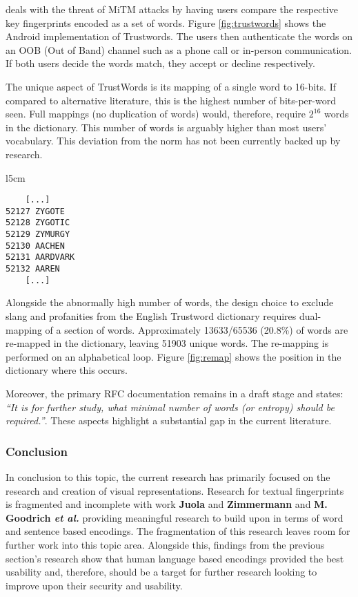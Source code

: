 \pep deals with the threat of MiTM attacks by having users compare the respective key fingerprints encoded as a set of words. Figure \ref{fig:trustwords} shows the \pep Android implementation of Trustwords. The users then authenticate the words on an OOB (Out of Band) channel such as a phone call or in-person communication. If both users decide the words match, they accept or decline respectively.

The unique aspect of TrustWords is its mapping of a single word to 16-bits. If compared to alternative literature, this is the highest number of bits-per-word seen. Full mappings (no duplication of words) would, therefore, require $2^{16}$ words in the dictionary. This number of words is arguably higher than most users' vocabulary. This deviation from the norm has not been currently backed up by research. 

\begin{wrapfigure}[11]{l}{5cm}
    \centering
    \begin{BVerbatim}
    [...]
52127 ZYGOTE
52128 ZYGOTIC
52129 ZYMURGY
52130 AACHEN
52131 AARDVARK
52132 AAREN
    [...]
    \end{BVerbatim}
    \caption{Re-mapping position}
    \label{fig:remap}
\end{wrapfigure}

Alongside the abnormally high number of words, the design choice to exclude slang and profanities from the English Trustword dictionary requires dual-mapping of a section of words. Approximately 13633/65536 (20.8\%) of words are re-mapped in the dictionary, leaving 51903 unique words. The re-mapping is performed on an alphabetical loop. Figure \ref{fig:remap} shows the position in the dictionary where this occurs.

\newpage

Moreover, the primary RFC documentation remains in a draft stage and states: \textit{``It is for further study, what minimal number of words (or entropy) should be required.''}. These aspects highlight a substantial gap in the current literature.

\subsubsection*{Conclusion}

In conclusion to this topic, the current research has primarily focused on the research and creation of visual representations. Research for textual fingerprints is fragmented and incomplete with work \textbf{Juola} and \textbf{Zimmermann} 
\cite{juola1996whole} and \textbf{M. Goodrich \textit{et al.}}\cite{goodrich2006loud} providing meaningful research to build upon in terms of word and sentence based encodings. The fragmentation of this research leaves room for further work into this topic area. Alongside this, findings from the previous section's research show that human language based encodings provided the best usability and, therefore, should be a target for further research looking to improve upon their security and usability.

